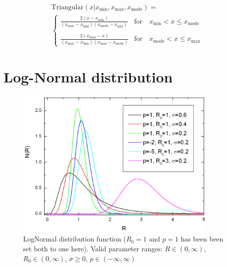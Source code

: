 \begin{subequations}
\begin{multline}
\text{Triangular}(x\vert x_\text{min},x_\text{max},x_\text{mode})   =  \\
   \begin{cases}
      \displaystyle \frac{2(x-x_\text{min})}{(x_\text{max}-x_\text{min})(x_\text{mode}-x_\text{min})} & \text{for} \quad x_\text{min}<x\leq x_\text{mode} \\
      & \\
      \displaystyle \frac{2(x_\text{max}-x)}{(x_\text{max}-x_\text{min})(x_\text{max}-x_\text{mode})} & \text{for} \quad x_\text{mode}<x\leq x_\text{max}
   \end{cases}
\end{multline}
\end{subequations}


\clearpage
\section{Log-Normal distribution}
\label{sect:LogNormSD}
\begin{figure}[htb]
\begin{center}
\includegraphics[width=0.878\textwidth,height=0.656\textwidth]{LogNorm.png}
\end{center}
\caption{LogNormal distribution function ($R_0=1$ and $p=1$ has
been been set both to one here). Valid parameter ranges: $R \in
(0,\infty)$, $R_0 \in (0,\infty)$, $\sigma\geq 0$, $p \in
(-\infty,\infty)$} \label{fig:LogNormal}
\end{figure}

